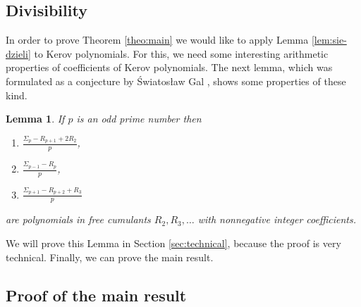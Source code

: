 \documentclass[12pt]{amsart}
\theoremstyle{plain}
\newtheorem{lemma}{Lemma}[section]
\theoremstyle{remark}
\begin{document}
\subsection{Divisibility}

In order to prove Theorem \ref{theo:main} we would like to apply Lemma
\ref{lem:sie-dzieli} to Kerov polynomials. For this, we need some interesting
arithmetic properties of coefficients of Kerov polynomials. The next lemma,
which was formulated as a conjecture by Światosław Gal \cite{Gal}, shows some
properties of these kind.

\begin{lemma}
\label{lem:div}
If $p$ is an odd prime number then 
\begin{enumerate}[label=(\alph*)]
 \item \label{lem:gal_a} $ \frac{\Sigma_{p}-R_{p+1}+2 R_2}{p}$,
 \item \label{lem:gal_b} $ \frac{\Sigma_{p-1}-R_p}{p} $,
 \item \label{lem:gal_c} $\frac{\Sigma_{p+1}-R_{p+2}+R_3}{p}$
\end{enumerate}
are polynomials in free cumulants $R_2,R_3,\dots$
with nonnegative integer coefficients.
\end{lemma}

We will prove this Lemma in Section \ref{sec:technical}, because the proof is
very technical. Finally, we can prove the main result.


\subsection{Proof of the main result}
\end{document}

